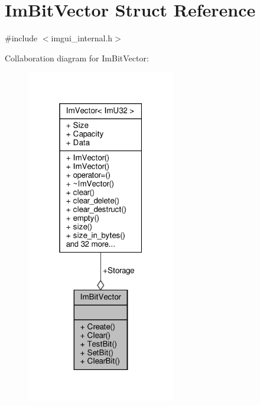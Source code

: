 \hypertarget{structImBitVector}{}\section{Im\+Bit\+Vector Struct Reference}
\label{structImBitVector}


{\ttfamily \#include $<$imgui\+\_\+internal.\+h$>$}



Collaboration diagram for Im\+Bit\+Vector\+:
\nopagebreak
\begin{figure}[H]
\begin{center}
\leavevmode
\includegraphics[width=184pt]{structImBitVector__coll__graph}
\end{center}
\end{figure}
